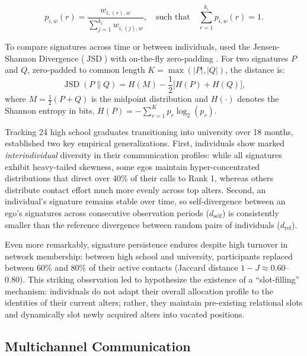 \documentclass[11pt,letterpaper]{article}
\newcommand{\JSD}{\operatorname{JSD}}
\newcommand{\dself}{d_{\mathrm{self}}}
\newcommand{\dref}{d_{\mathrm{ref}}}
\begin{document}
\begin{equation}
    p_{i,w}(r) = \frac{w_{i,(r),w}}{\sum_{j=1}^{k_i} w_{i,(j),w}}, \quad \text{such that} \quad \sum_{r=1}^{k_i} p_{i,w}(r) = 1.
    \label{eq:signature_def}
\end{equation}

To compare signatures across time or between individuals, \citet{saramaeki2014persistence} used the Jensen-Shannon Divergence ($\JSD$) with on-the-fly zero-padding \citep{lin1991divergence}. For two signatures $P$ and $Q$, zero-padded to common length $K = \max(|P|, |Q|)$, the distance is:
\begin{equation}
    \JSD(P \parallel Q) = H(M) - \frac{1}{2}\big[H(P) + H(Q)\big],
    \label{eq:jsd_def}
\end{equation}
where $M = \frac{1}{2}(P + Q)$ is the midpoint distribution and $H(\cdot)$ denotes the Shannon entropy in bits, $H(P) = -\sum_{r=1}^K p_r \log_2(p_r)$. 

Tracking 24 high school graduates transitioning into university over 18 months, \citet{saramaeki2014persistence} established two key empirical generalizations. First, individuals show marked \textit{interindividual} diversity in their communication profiles: while all signatures exhibit heavy-tailed skewness, some egos maintain hyper-concentrated distributions that direct over 40\% of their calls to Rank 1, whereas others distribute contact effort much more evenly across top alters. Second, an individual's signature remains stable over time, so self-divergence between an ego's signatures across consecutive observation periods ($\dself$) is consistently smaller than the reference divergence between random pairs of individuals ($\dref$). 

Even more remarkably, signature persistence endures despite high turnover in network membership: between high school and university, participants replaced between 60\% and 80\% of their active contacts (Jaccard distance $1 - J \approx 0.60$--$0.80$). This striking observation led \citet{saramaeki2014persistence} to hypothesize the existence of a ``slot-filling'' mechanism: individuals do not adapt their overall allocation profile to the identities of their current alters; rather, they maintain pre-existing relational slots and dynamically slot newly acquired alters into vacated positions.

\subsection{Multichannel Communication}
\end{document}
